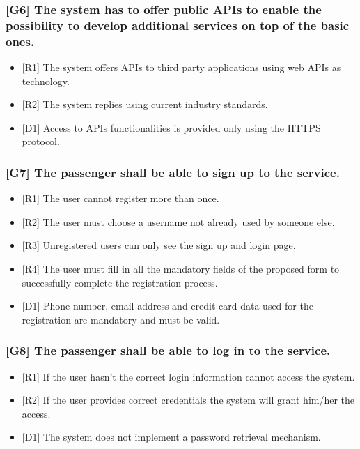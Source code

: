 \documentclass[a4paper,11pt]{report} %
\begin{document}
	\subsubsection{{[}G6{]} The system has to offer public APIs to enable the possibility to develop additional services on top of the basic ones.}
	\begin{itemize}
		\item {[}R1{]} The system offers APIs to third party applications using web APIs as technology.
		\item {[}R2{]} The system replies using current industry standards.
		\item {[}D1{]} Access to APIs functionalities is provided only using the HTTPS protocol.
	\end{itemize}
		
	\subsubsection{{[}G7{]} The passenger shall be able to sign up to the service.}
	\begin{itemize}
		\item {[}R1{]} The user cannot register more than once.
		\item {[}R2{]} The user must choose a username not already used by someone else.
		\item {[}R3{]} Unregistered users can only see the sign up and login page.
		\item {[}R4{]} The user must fill in all the mandatory fields of the proposed form to successfully complete the registration process.
		\item {[}D1{]} Phone number, email address and credit card data used for the registration are mandatory and must be valid.
	\end{itemize}
		
	\subsubsection{{[}G8{]} The passenger shall be able to log in to the service.}
	\begin{itemize}
		\item {[}R1{]} If the user hasn't the correct login information cannot access the system.
		\item {[}R2{]} If the user provides correct credentials the system will grant him/her the access.
		\item {[}D1{]} The system does not implement a password retrieval mechanism.
	\end{itemize}
		
\end{document}
